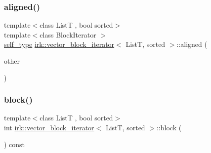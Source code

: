 \mbox{\label{classirk_1_1vector__block__iterator_af5332945a82553b1af770b7863c2769f}} 
\subsubsection{\texorpdfstring{aligned()}{aligned()}}
{\footnotesize\ttfamily template$<$class ListT , bool sorted$>$ \\
template$<$class Block\+Iterator $>$ \\
\mbox{\hyperlink{classirk_1_1vector__block__iterator_a39e5fae2a4258ea1a7cad14a66be2908}{self\+\_\+type}} \mbox{\hyperlink{classirk_1_1vector__block__iterator}{irk\+::vector\+\_\+block\+\_\+iterator}}$<$ ListT, sorted $>$\+::aligned (\begin{DoxyParamCaption}\item[{const Block\+Iterator \&}]{other }\end{DoxyParamCaption})\hspace{0.3cm}{\ttfamily [inline]}}

\mbox{\label{classirk_1_1vector__block__iterator_a820d31edd98d2ecf75daa93efcebd06d}} 
\subsubsection{\texorpdfstring{block()}{block()}}
{\footnotesize\ttfamily template$<$class ListT , bool sorted$>$ \\
int \mbox{\hyperlink{classirk_1_1vector__block__iterator}{irk\+::vector\+\_\+block\+\_\+iterator}}$<$ ListT, sorted $>$\+::block (\begin{DoxyParamCaption}{ }\end{DoxyParamCaption}) const\hspace{0.3cm}{\ttfamily [inline]}}

\mbox{\label{classirk_1_1vector__block__iterator_a698954af3be4c0e65b699141b9b8d0f7}} 
